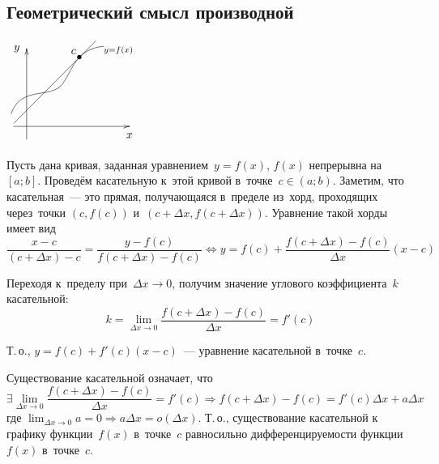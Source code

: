 \subsection{Геометрический смысл производной}
\begin{floatingfigure}[r]{43mm}
\noindent
$\begin{xy} /r8mm/:
(-0.5, 0); (4, 0) **@{-} *@{>} *++!U{x};
(0, -0.5); (0, 3) **@{-} *@{>} *++!R{y};
(-0.6, 0.5); (3, 3.1) **\crv{(-0.25, 1.5) & (1.75, 0.75) & (1.75, 3)} *!LU{\scriptstyle y = f(x)};
(-0.5, 0.12); (2.68, 3.3) **@{-};
(2.05, 2.67) *{\bullet} *+!DR{c};
\end{xy}$
\end{floatingfigure}
Пусть дана кривая, заданная уравнением~$y = f(x)$, $f(x)$ непрерывна на~$[a; b]$.
Проведём касательную к~этой кривой в~точке~$c \in (a; b)$.
Заметим, что касательная~--- это прямая, получающаяся в~пределе из~хорд, проходящих через~точки $(c, f(c))$ и~$(c + \Delta x, f(c + \Delta x))$.
Уравнение такой хорды имеет вид
\begin{equation*}
\frac{x - c}{(c + \Delta x) - c} = \frac{y - f(c)}{f(c + \Delta x) - f(c)} \Leftrightarrow
y = f(c) + \frac{f(c + \Delta x) - f(c)}{\Delta x} (x - c)
\end{equation*}

Переходя к~пределу при~$\Delta x \to 0$, получим значение углового коэффициента~$k$ касательной:
\begin{equation*}
k = \lim_{\Delta x \to 0} \frac{f(c + \Delta x) - f(c)}{\Delta x} = f'(c)
\end{equation*}

Т.\,о., $y = f(c) + f'(c)(x - c)$~--- уравнение касательной в~точке~$c$.

Существование касательной означает, что
\begin{equation*}
\displaystyle \exists \lim_{\Delta x \to 0} \frac{f(c + \Delta x) - f(c)}{\Delta x} = f'(c) \Rightarrow
f(c + \Delta x) - f(c) = f'(c) \Delta x + a\Delta x
\end{equation*}
где $\displaystyle \lim_{\Delta x \to 0} a = 0 \Rightarrow a\Delta x = o(\Delta x)$.
Т.\,о., существование касательной к графику функции~$f(x)$ в~точке~$c$ равносильно дифференцируемости функции~$f(x)$ в~точке~$c$.